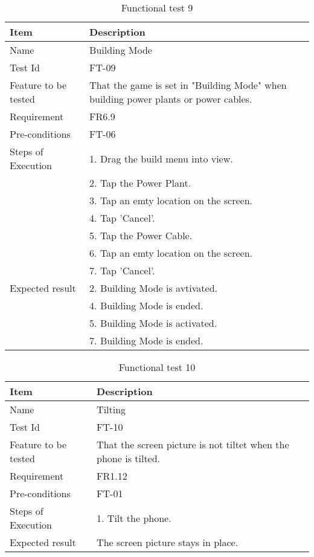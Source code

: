 \begin{table}[H]
\centering
	\begin{tabular}{ l | p{8cm} }
		\hline
		{\bf Item} & {\bf Description} \\ \hline
		Name & Building Mode \\ 
		Test Id & FT-09 \\ 
		Feature to be tested & That the game is set in "Building Mode" when building power plants or power cables. \\ 
		Requirement & FR6.9 \\ 
		Pre-conditions & FT-06 \\ 
		Steps of Execution & 1. Drag the build menu into view. \\ 
		& 2. Tap the Power Plant. \\
		& 3. Tap an emty location on the screen. \\
		& 4. Tap 'Cancel'. \\
		& 5. Tap the Power Cable. \\
		& 6. Tap an emty location on the screen. \\
		& 7. Tap 'Cancel'. \\
		Expected result & 2. Building Mode is avtivated. \\ 
		& 4. Building Mode is ended. \\
		& 5. Building Mode is activated. \\
		& 7. Building Mode is ended. \\
	\end{tabular}
	\caption{Functional test 9}
\end{table}

\begin{table}[H]
\centering
	\begin{tabular}{ l | p{8cm} }
		\hline
		{\bf Item} & {\bf Description} \\ \hline
		Name & Tilting \\ 
		Test Id & FT-10 \\ 
		Feature to be tested & That the screen picture is not tiltet when the phone is tilted. \\ 
		Requirement & FR1.12 \\ 
		Pre-conditions & FT-01 \\ 
		Steps of Execution & 1. Tilt the phone. \\ 
		Expected result & The screen picture stays in place. \\ 
	\end{tabular}
	\caption{Functional test 10}
\end{table}

